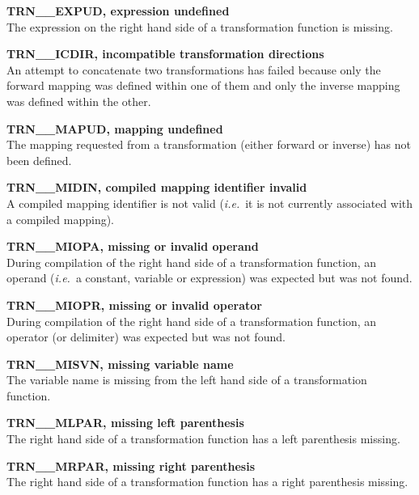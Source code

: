 \begin{description}
\item {\bf TRN\_\_EXPUD, expression undefined}\\
The expression on the right hand side of a transformation function is
missing. 

\item {\bf TRN\_\_ICDIR, incompatible transformation directions}\\
An attempt to concatenate two transformations has failed because only the 
forward mapping was defined within one of them and only the inverse mapping 
was defined within the other.

\item {\bf TRN\_\_MAPUD, mapping undefined}\\
The mapping requested from a transformation (either forward or inverse) has
not been defined. 

\item {\bf TRN\_\_MIDIN, compiled mapping identifier invalid}\\
A compiled mapping identifier is not valid ({\em i.e.}\ it is not currently
associated with a compiled mapping). 

\item {\bf TRN\_\_MIOPA, missing or invalid operand}\\
During compilation of the right hand side of a transformation function, an
operand ({\em i.e.}\ a constant, variable or expression) was expected but was
not found. 

\item {\bf TRN\_\_MIOPR, missing or invalid operator}\\
During compilation of the right hand side of a transformation function, an
operator (or delimiter) was expected but was not found. 

\item {\bf TRN\_\_MISVN, missing variable name}\\
The variable name is missing from the left hand side of a transformation
function. 

\item {\bf TRN\_\_MLPAR, missing left parenthesis}\\
The right hand side of a transformation function has a left parenthesis
missing. 

\item {\bf TRN\_\_MRPAR, missing right parenthesis}\\
The right hand side of a transformation function has a right parenthesis
missing. 


\end{description}

